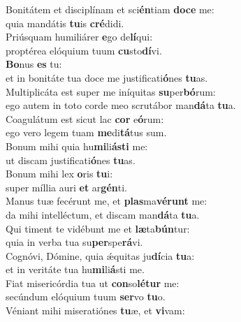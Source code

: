 \evenverse Bonitátem et disciplínam et sci\textbf{én}tiam \textbf{do}\textbf{ce} me:~\*\\
\evenverse quia mandátis \textbf{tu}is \textbf{cré}didi.\\
\oddverse Priúsquam humiliárer \textbf{e}go de\textbf{lí}qui:~\*\\
\oddverse proptérea elóquium tuum \textbf{cu}sto\textbf{dí}vi.\\
\evenverse \textbf{Bo}nus \textbf{es} tu:~\*\\
\evenverse et in bonitáte tua doce me justificati\textbf{ó}nes \textbf{tu}as.\\
\oddverse Multiplicáta est super me iníquitas \textbf{su}per\textbf{bó}rum:~\*\\
\oddverse ego autem in toto corde meo scrutábor man\textbf{dá}ta \textbf{tu}a.\\
\evenverse Coagulátum est sicut lac \textbf{cor} e\textbf{ó}rum:~\*\\
\evenverse ego vero legem tuam \textbf{me}di\textbf{tá}tus sum.\\
\oddverse Bonum mihi quia hu\textbf{mi}li\textbf{á}\textbf{sti} me:~\*\\
\oddverse ut discam justificati\textbf{ó}nes \textbf{tu}as.\\
\evenverse Bonum mihi lex \textbf{o}ris \textbf{tu}i:~\*\\
\evenverse super míllia auri \textbf{et} ar\textbf{gén}ti.\\
\oddverse Manus tuæ fecérunt me, et \textbf{plas}ma\textbf{vé}\textbf{runt} me:~\*\\
\oddverse da mihi intelléctum, et discam man\textbf{dá}ta \textbf{tu}a.\\
\evenverse Qui timent te vidébunt me et \textbf{læ}ta\textbf{bún}tur:~\*\\
\evenverse quia in verba tua su\textbf{per}spe\textbf{rá}vi.\\
\oddverse Cognóvi, Dómine, quia ǽquitas ju\textbf{dí}cia \textbf{tu}a:~\*\\
\oddverse et in veritáte tua hu\textbf{mi}li\textbf{á}sti me.\\
\evenverse Fiat misericórdia tua ut \textbf{con}so\textbf{lé}\textbf{tur} me:~\*\\
\evenverse secúndum elóquium tuum \textbf{ser}vo \textbf{tu}o.\\
\oddverse Véniant mihi miseratiónes \textbf{tu}æ, et \textbf{vi}vam:~\*\\
